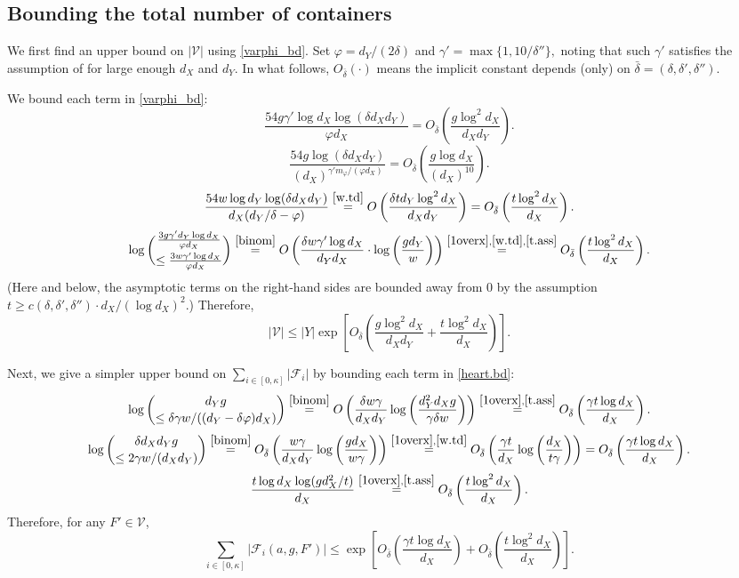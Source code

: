 \documentclass[a4paper]{amsart}
\theoremstyle{definition}
\newcommand{\cF}{\mathcal{F} }
\newcommand{\cV}{\mathcal{V} }
\newcommand{\beq}[1]{\begin{equation}\label{#1}}
\newcommand{\enq}[0]{\end{equation}}
\newcommand{\gd}[0]{\delta }
\newcommand{\0}[0]{\emptyset}
\begin{document}
\subsection{Bounding the total number of containers} We first find an upper bound on $|\mathcal{V}|$ using \eqref{varphi_bd}. Set $\varphi=d_Y/(2\delta)$ and $\gamma' =\max\{1,10/\gd''\},$ noting that such $\gamma'$ satisfies the assumption of  for large enough $d_X$ and $d_Y.$ In what follows, $O_{{\bar\gd}}(\cdot)$ means the implicit constant depends (only) on $\bar \gd=(\gd, \gd', \gd'')$.

We bound each term in \eqref{varphi_bd}:
\[\frac{54g\gamma'\log d_X \log (\delta d_Xd_Y)}{\varphi d_X}=O_{\bar \gd}\left(\frac{g\log^2 d_X}{d_Xd_Y}\right).\]
\[\frac{54g\log (\delta d_Xd_Y)}{(d_X)^{\gamma'm_\varphi/(\varphi d_X)}}=O_{\bar \gd}\left(\frac{g\log d_X}{(d_X)^{10}}\right).\]
\[\frac{54w\log d_Y \log (\delta d_Xd_Y)}{d_X(d_Y/\gd-\varphi)}\stackrel{\eqref{w.td}}{=}O\left(\frac{\gd td_Y\log^2 d_X}{d_Xd_Y}\right)=O_{\bar\gd}\left(\frac{t\log^2 d_X}{d_X}\right).\]
\[\log {\frac{3g\gamma'd_Y\log d_X}{\varphi d_X}\choose \le \frac{3w\gamma'\log d_X}{\varphi d_X}}\stackrel{\eqref{binom}}{=}O\left(\frac{\gd w\gamma' \log d_X}{d_Yd_X}\cdot \log\left(\frac{gd_Y}{w}\right)\right)\stackrel{\eqref{1overx},\eqref{w.td}, \eqref{t.ass}}{=}O_{\bar\gd}\left(\frac{t\log^2  d_X}{d_X}\right).\]
(Here and below, the asymptotic terms on the right-hand sides are bounded away from 0 by the assumption $t \ge c(\gd, \gd', \gd'')\cdot d_X/(\log d_X)^2$.) Therefore,
\beq{v.total} |\cV|\leq|Y| \exp\left[O_{\bar \gd} \left(\frac{g\log^2d_X}{d_Xd_Y}+\frac{t\log^2 d_X}{d_X}\right)\right].\enq

Next, we give a simpler upper bound on $\sum_{i \in [0, \kappa]}|\cF_i|$ by bounding each term in \eqref{heart.bd}:
\[\log{d_Yg \choose \le \delta \gamma w/((d_Y-\delta \varphi)d_X)}\stackrel{\eqref{binom}}{=}O\left(\frac{\gd w\gamma}{d_Xd_Y}\log\left(\frac{d_Y^2d_Xg}{\gamma\delta w}\right)\right)\stackrel{\eqref{1overx},\eqref{t.ass}}{=}O_{\bar\gd}\left(\frac{\gamma t \log d_X}{d_X}\right).\]
\[\log{\delta d_X d_Y g \choose \le 2\gamma w/(d_Xd_Y)}\stackrel{\eqref{binom}}{=}O_{\bar\gd}\left(\frac{w\gamma}{d_Xd_Y}\log\left(\frac{gd_X}{w\gamma}\right)\right)\stackrel{\eqref{1overx},\eqref{w.td}}{=}O_{\bar\gd}\left(\frac{\gamma t}{d_X}\log\left(\frac{d_X}{t\gamma}\right)\right)=O_{\bar\gd}\left(\frac{\gamma t\log d_X}{d_X}\right).\]
\[\frac{t\log d_X \log(gd_X^2/t)}{d_X}\stackrel{\eqref{1overx},\eqref{t.ass}}{=}O_{\bar\gd}\left(\frac{t\log^2 d_X}{d_X}\right).\]
Therefore, for any $F'\in \cV$,
    \beq{w.cost} \sum_{i \in [0, \kappa]}|\cF_i(a,g,F')|\le \exp\left[O_{\bar \gd}\left(\frac{\gamma t\log d_X}{d_X}\right)+O_{\bar\gd}\left(\frac{t\log^2 d_X}{d_X}\right)\right].\enq
\end{document}
